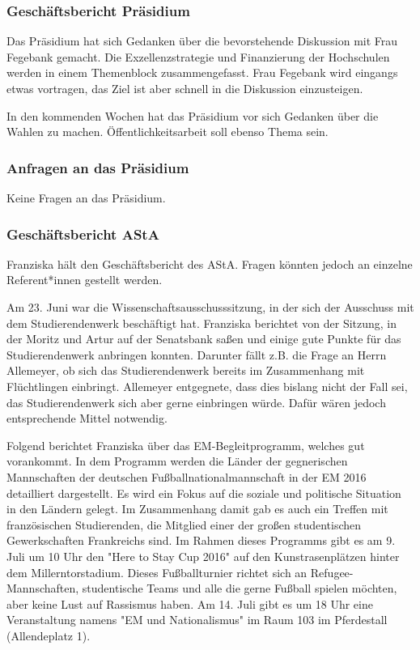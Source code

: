 \documentclass[ngerman,headheight=70pt]{scrartcl}
\begin{document}
    \subsubsection{Geschäftsbericht Präsidium}

    Das Präsidium hat sich Gedanken über die bevorstehende Diskussion mit
    Frau Fegebank gemacht. Die Exzellenzstrategie und Finanzierung der Hochschulen
    werden in einem Themenblock zusammengefasst. Frau Fegebank wird eingangs etwas
    vortragen, das Ziel ist aber schnell in die Diskussion einzusteigen.

    In den kommenden Wochen hat das Präsidium vor sich Gedanken über die Wahlen
    zu machen. Öffentlichkeitsarbeit soll ebenso Thema sein.

    \subsubsection{Anfragen an das Präsidium}

    Keine Fragen an das Präsidium.

    \subsubsection{Geschäftsbericht AStA}

    Franziska hält den Geschäftsbericht des AStA. Fragen könnten jedoch an einzelne
    Referent*innen gestellt werden.

    Am 23. Juni war die Wissenschaftsausschusssitzung, in der sich der Ausschuss
    mit dem Studierendenwerk beschäftigt hat. Franziska berichtet von der Sitzung,
    in der Moritz und Artur auf der Senatsbank saßen und einige gute Punkte für
    das Studierendenwerk anbringen konnten. Darunter fällt z.B. die Frage
    an Herrn Allemeyer, ob sich das Studierendenwerk bereits im Zusammenhang
    mit Flüchtlingen einbringt. Allemeyer entgegnete, dass dies bislang nicht
    der Fall sei, das Studierendenwerk sich aber gerne einbringen würde. Dafür
    wären jedoch entsprechende Mittel notwendig.

    Folgend berichtet Franziska über das EM-Begleitprogramm, welches gut vorankommt.
    In dem Programm werden die Länder der gegnerischen Mannschaften der
    deutschen Fußballnationalmannschaft in der EM 2016 detailliert dargestellt.
    Es wird ein Fokus auf die soziale und politische Situation in den Ländern
    gelegt. Im Zusammenhang damit gab es auch ein Treffen mit französischen
    Studierenden, die Mitglied einer der großen studentischen Gewerkschaften
    Frankreichs sind.
    Im Rahmen dieses Programms gibt es am 9. Juli um 10 Uhr den "Here to Stay Cup 2016"
    auf den Kunstrasenplätzen hinter dem Millerntorstadium. Dieses Fußballturnier
    richtet sich an Refugee-Mannschaften, studentische Teams und alle die gerne
    Fußball spielen möchten, aber keine Lust auf Rassismus haben.
    Am 14. Juli gibt es um 18 Uhr eine Veranstaltung namens "EM und Nationalismus"
    im Raum 103 im Pferdestall (Allendeplatz 1).
\end{document}
